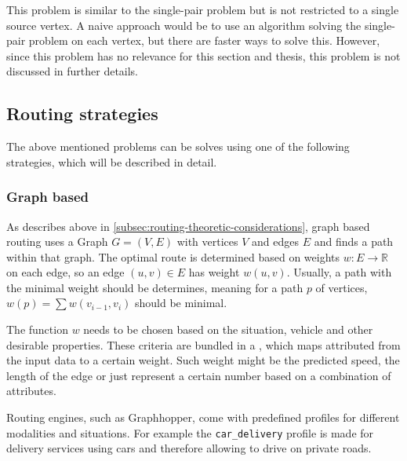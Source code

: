 		\subsubsection{}
		
			This problem is similar to the single-pair problem but is not restricted to a single source vertex.
			A naive approach would be to use an algorithm solving the single-pair problem on each vertex, but there are faster ways to solve this.
			However, since this problem has no relevance for this section and thesis, this problem is not discussed in further details.
	
	\subsection{Routing strategies}
	
		The above mentioned problems can be solves using one of the following strategies, which will be described in detail.
	
		\subsubsection{Graph based}
		
			As describes above in \cref{subsec:routing-theoretic-considerations}, graph based routing uses a Graph $G=(V, E)$ with vertices $V$ and edges $E$ and finds a path within that graph.
			The optimal route is determined based on weights $w : E \rightarrow \mathbb{R}$ on each edge, so an edge $(u, v) \in E$ has weight $w(u, v)$.
			Usually, a path with the minimal weight should be determines, meaning for a path $p$ of vertices, $w(p) = \sum{w(v_{i-1}, v_i)}$ should be minimal\cite[645]{cormen-introduction-to-alg}.
			
			The function $w$ needs to be chosen based on the situation, vehicle and other desirable properties.
			These criteria are bundled in a , which maps attributed from the input data to a certain weight.
			Such weight might be the predicted speed\cite{graphhopper-profile-bike-speeds}, the length of the edge\cite{graphhopper-profile-shortest} or just represent a certain number based on a combination of attributes\cite{graphhopper-profile-short-fastest}.
			
			Routing engines, such as Graphhopper, come with predefined profiles for different modalities and situations.
			For example the \texttt{car\_delivery} profile is made for delivery services using cars and therefore allowing to drive on private roads\cite{graphhopper-routing-profiles}.
			

